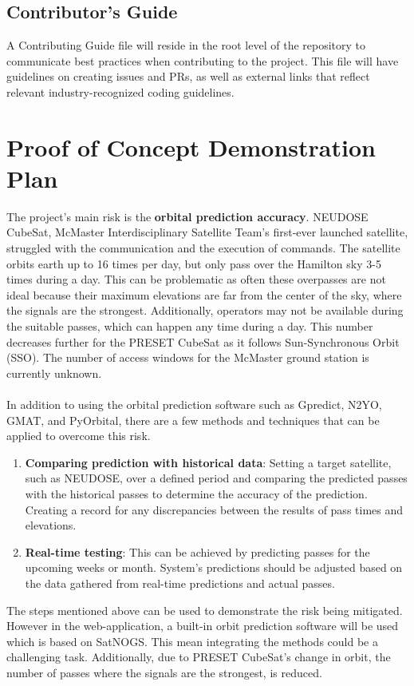 \documentclass{article}
\begin{document}
\subsection{Contributor's Guide}
A Contributing Guide file will reside in the root level of the repository to communicate best practices when contributing to the project. This file will have guidelines on creating issues and PRs, as well as external links that reflect relevant industry-recognized coding guidelines.


\section{Proof of Concept Demonstration Plan}

The project's main risk is the \textbf{orbital prediction accuracy}. NEUDOSE CubeSat, McMaster Interdisciplinary Satellite Team's first-ever launched satellite, struggled with the communication and the execution of commands. The satellite orbits earth up to 16 times per day, but only pass over the Hamilton sky 3-5 times during a day. This can be problematic as often these overpasses are not ideal because their maximum elevations are far from the center of the sky, where the signals are the strongest. Additionally, operators may not be available during the suitable passes, which can happen any time during a day. This number decreases further for the PRESET CubeSat as it follows Sun-Synchronous Orbit (SSO). The number of access windows for the McMaster ground station is currently unknown.
\\\\
In addition to using the orbital prediction software such as Gpredict, N2YO, GMAT, and PyOrbital, there are a few methods and techniques that can be applied to overcome this risk.

\begin{enumerate}
    \item \textbf{Comparing prediction with historical data}: Setting a target satellite, such as NEUDOSE, over a defined period and comparing the predicted passes with the historical passes to determine the accuracy of the prediction. Creating a record for any discrepancies between the results of pass times and elevations.
    \item \textbf{Real-time testing}: This can be achieved by predicting passes for the upcoming weeks or month. System's predictions should be adjusted based on the data gathered from real-time predictions and actual passes. 
\end{enumerate}
The steps mentioned above can be used to demonstrate the risk being mitigated. However in the web-application, a built-in orbit prediction software will be used which is based on SatNOGS. This mean integrating the methods could be a challenging task. Additionally, due to PRESET CubeSat's change in orbit, the number of passes where the signals are the strongest, is reduced.
\end{document}
